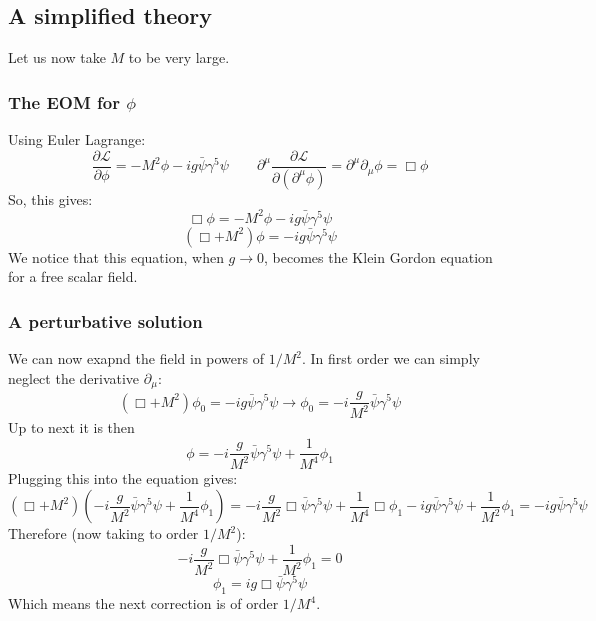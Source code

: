 \documentclass{article}
\begin{document}
\subsection{A simplified theory}
Let us now take $M$ to be very large.
\subsubsection{The EOM for $\phi$}
Using Euler Lagrange:
\begin{equation}
    \frac{\partial \mathcal{L}}{\partial\phi} = -M^2\phi - ig\bar{\psi}\gamma^5\psi
    \qquad
    \partial^\mu \frac{\partial \mathcal{L}}{\partial\left(\partial^\mu \phi\right)} = \partial^\mu\partial_\mu \phi = \Box \phi
\end{equation}
So, this gives:
\begin{equation}
    \Box \phi = - M^2\phi - ig\bar{\psi}\gamma^5\psi
\end{equation}
\begin{equation}
    \left(\Box + M^2\right) \phi = - ig\bar{\psi}\gamma^5\psi
\end{equation}
We notice that this equation, when $g \rightarrow 0$, becomes the Klein Gordon equation for a free scalar field.
\subsubsection{A perturbative solution}
We can now exapnd the field in powers of $1/M^2$. In first order we can simply neglect the derivative $\partial_\mu$:
\begin{equation}
    \left(\Box + M^2\right) \phi_0 = - ig\bar{\psi}\gamma^5\psi \rightarrow \phi_0 = -i\frac{g}{M^2}\bar{\psi}\gamma^5\psi
\end{equation}
Up to next it is then
\begin{equation}
    \phi = -i\frac{g}{M^2}\bar{\psi}\gamma^5\psi + \frac{1}{M^4}\phi_1
\end{equation}
Plugging this into the equation gives:
\begin{equation}
    \left(\Box + M^2\right)\left(-i\frac{g}{M^2}\bar{\psi}\gamma^5\psi + \frac{1}{M^4}\phi_1\right) = -i\frac{g}{M^2}\Box\bar{\psi}\gamma^5\psi + \frac{1}{M^4}\Box\phi_1 - ig\bar{\psi}\gamma^5\psi + \frac{1}{M^2}\phi_1 = - ig\bar{\psi}\gamma^5\psi
\end{equation}
Therefore (now taking to order $1/M^2$):
\begin{equation}
    -i\frac{g}{M^2}\Box\bar{\psi}\gamma^5\psi + \frac{1}{M^2}\phi_1 = 0
\end{equation}
\begin{equation}
    \phi_1 = ig\Box\bar{\psi}\gamma^5\psi
\end{equation}
Which means the next correction is of order $1/M^4$.
\end{document}
